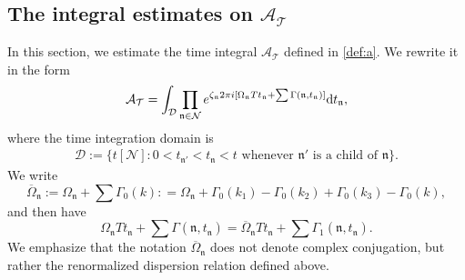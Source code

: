 \documentclass[UTF-8,reqno]{amsart}
\numberwithin{equation}{section}
\theoremstyle{definition}
\def\dif{{\mathord{{\rm d}}}}
\def\dif{{\mathord{{\rm d}}}}
\begin{document}
\subsection{The integral estimates on $\mathcal{A}_{\mathcal{T}}$}
In this section, we estimate the time integral $\mathcal{A}_{\mathcal{T}}$ defined in \eqref{def:a}. We rewrite it in the form 
\begin{align*}
 \mathcal{A}_{\mathcal{T}}=   \int_{\mathcal{D}}\prod_{\mathfrak{n}\in\mathcal{N}}  e^{\zeta_\mathfrak{n}2\pi i[\Omega_\mathfrak{n}Tt_\mathfrak{n}+\sum\Gamma(\mathfrak{n},t_\mathfrak{n})] } \dif t_\mathfrak{n},
\end{align*}
where the time integration domain is
\begin{align*}
\mathcal{D} := \{t{[\mathcal{N}]} : 0 < t_{\mathfrak{n}'} < t_\mathfrak{n}<t  \text{ whenever } \mathfrak{n}' \text{ is a child of } \mathfrak{n} \}.
\end{align*}
We write $$\overline\Omega_\mathfrak{n}:=\Omega_\mathfrak{n}+\sum\Gamma_0(k): =\Omega_\mathfrak{n}+\Gamma_0(k_1)-\Gamma_0(k_2)+\Gamma_0(k_3)-\Gamma_0(k),$$
and  then have 
$$\Omega_\mathfrak{n}Tt_\mathfrak{n}+\sum\Gamma(\mathfrak{n},t_\mathfrak{n})=\overline\Omega_\mathfrak{n}Tt_\mathfrak{n}+\sum\Gamma_1(\mathfrak{n},t_\mathfrak{n}).$$
We  emphasize that the notation $\overline{\Omega}_{\mathfrak{n}}$ does not denote complex conjugation, but rather the renormalized dispersion relation defined above.
\end{document}
